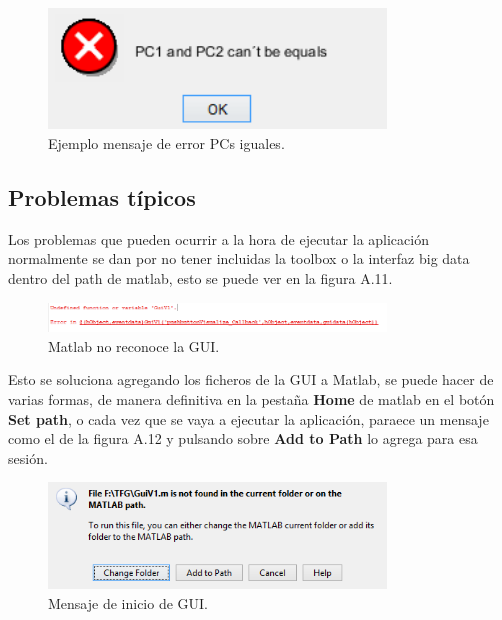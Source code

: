 \begin{figure}
\centering
\includegraphics[width=0.8\textwidth]{imagenes/figuras/MU-10.png}
\caption{Ejemplo mensaje de error PCs iguales.}
\end{figure}

\subsection{Problemas típicos}

Los problemas que pueden ocurrir a la hora de ejecutar la aplicación normalmente se dan por no tener incluidas la toolbox o la interfaz big data dentro del path de matlab, esto se puede ver en la figura A.11.


\begin{figure}[H]
\centering
\includegraphics[width=0.8\textwidth]{imagenes/figuras/MU-11.png}
\caption{Matlab no reconoce la GUI.}
\end{figure}

Esto se soluciona agregando los ficheros de la GUI a Matlab, se puede hacer de varias formas, de manera definitiva en la pestaña \textbf{Home} de matlab en el botón \textbf{Set path}, o cada vez que se vaya a ejecutar la aplicación, paraece un mensaje como el de la figura A.12 y pulsando sobre \textbf{Add to Path} lo agrega para esa sesión.

\begin{figure}[H]
\centering
\includegraphics[width=0.8\textwidth]{imagenes/figuras/MU-12.png}
\caption{Mensaje de inicio de GUI.}
\end{figure}


